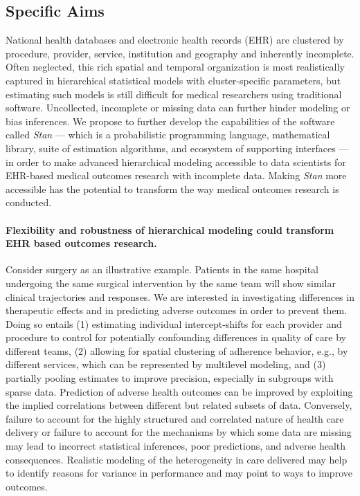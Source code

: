 \documentclass[11pt,notitlepage]{article}
\begin{document}
\subsection*{Specific Aims}

National health databases and electronic health records (EHR) are 
clustered by procedure, provider, service, institution and geography and inherently incomplete. Often 
neglected, this rich spatial and temporal organization is most realistically 
captured in hierarchical statistical models with cluster-specific parameters, but 
estimating such models is still difficult for medical researchers using traditional software.
Uncollected, incomplete or missing data can further hinder modeling or bias inferences.
We propose to further develop the capabilities of the software called \textit{Stan} --- 
which is a probabilistic programming language, mathematical library, suite of estimation
algorithms, and ecosystem of supporting interfaces --- in order to make advanced hierarchical  
modeling accessible to data scientists for EHR-based medical outcomes research with incomplete data.
Making \textit{Stan} more accessible has the potential to transform the way medical outcomes research is conducted.

\paragraph*{Flexibility and robustness of hierarchical modeling could 
transform EHR based outcomes research.} Consider surgery as an 
illustrative example. Patients in the same hospital undergoing the 
same surgical intervention by the same team will show similar clinical 
trajectories and responses. We are interested in investigating
differences in therapeutic effects and in predicting adverse outcomes in order to prevent 
them. Doing so entails (1) estimating individual intercept-shifts for each provider and procedure to control for potentially confounding differences 
in quality of care by different teams, (2) allowing for spatial clustering of adherence  behavior, e.g., by different services, 
which can be represented by multilevel modeling, and (3) partially pooling estimates to improve precision, especially in subgroups with sparse data.
Prediction of adverse health outcomes can be improved by exploiting the implied correlations between different but related subsets of data. 
Conversely, failure to account for the highly structured and correlated nature of health care delivery or 
failure to account for the mechanisms by which some data are missing may lead to incorrect statistical inferences, poor predictions, 
and adverse health consequences. Realistic modeling of the heterogeneity in care delivered may help to identify reasons for variance 
in performance and may point to ways to improve outcomes. 
\end{document}
